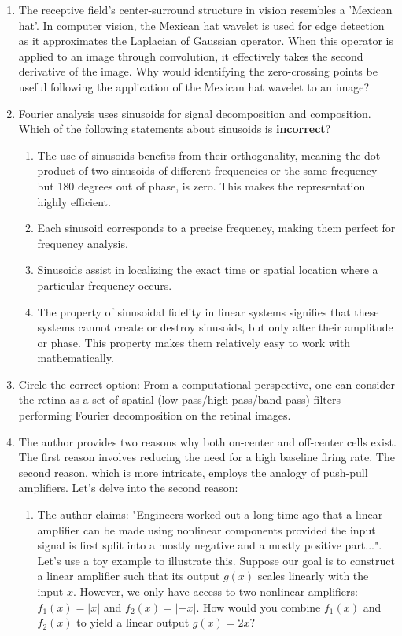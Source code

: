 \documentclass[11pt,letterpaper]{article}
\begin{document}
\begin{enumerate}
    \item The receptive field's center-surround structure in vision resembles a 'Mexican hat'. In computer vision, the Mexican hat wavelet is used for edge detection as it approximates the Laplacian of Gaussian operator. When this operator is applied to an image through convolution, it effectively takes the second derivative of the image. Why would identifying the zero-crossing points be useful following the application of the Mexican hat wavelet to an image?

    \pagebreak
    
    \item Fourier analysis uses sinusoids for signal decomposition and composition. Which of the following statements about sinusoids is \textbf{incorrect}?
    \begin{enumerate}
        \item The use of sinusoids benefits from their orthogonality, meaning the dot product of two sinusoids of different frequencies or the same frequency but 180 degrees out of phase, is zero. This makes the representation highly efficient.
        \item Each sinusoid corresponds to a precise frequency, making them perfect for frequency analysis.
        \item Sinusoids assist in localizing the exact time or spatial location where a particular frequency occurs.
        \item The property of sinusoidal fidelity in linear systems signifies that these systems cannot create or destroy sinusoids, but only alter their amplitude or phase. This property makes them relatively easy to work with mathematically.
    \end{enumerate}

    \item Circle the correct option: From a computational perspective, one can consider the retina as a set of spatial (low-pass/high-pass/band-pass) filters performing Fourier decomposition on the retinal images.
    
    \item The author provides two reasons why both on-center and off-center cells exist. The first reason involves reducing the need for a high baseline firing rate. The second reason, which is more intricate, employs the analogy of push-pull amplifiers. Let's delve into the second reason:
    \begin{enumerate}
        \item The author claims: "Engineers worked out a long time ago that a linear amplifier can be made using nonlinear components provided the input signal is first split into a mostly negative and a mostly positive part...". Let's use a toy example to illustrate this. Suppose our goal is to construct a linear amplifier such that its output $g(x)$ scales linearly with the input $x$. However, we only have access to two nonlinear amplifiers: $f_1(x) = |x|$ and $f_2(x) = |-x|$. How would you combine $f_1(x)$ and $f_2(x)$ to yield a linear output $g(x) = 2x$?
    

\end{enumerate}
\end{enumerate}
\end{document}
